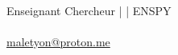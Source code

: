 \begin{titlepage}
\vspace{0.6cm}

\begin{center}
    {\large\bfseries\color{CouleurPrimaire}
        \auteurcours}\\[0.5ex]
    {\normalsize\color{CouleurSecondaire}
       Enseignant Chercheur | \laboratoire{} | ENSPY}\\[0.2ex]
    {\small\color{CouleurBordInfo}
        \institutionprimaire}\\[0.2ex]
    {\small\color{CouleurBordInfo}
        \href{mailto:maletyon@proton.me}{maletyon@proton.me}}
\end{center}

\end{titlepage}
